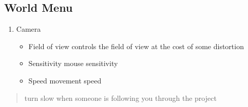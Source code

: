 \documentclass[letterpaper,10pt,english]{sphinxmanual}
\begin{document}
\subsection{World Menu}
\label{\detokenize{tutorial/Viewer_PC/documentation_rst/5_World:world-menu}}\label{\detokenize{tutorial/Viewer_PC/documentation_rst/5_World::doc}}
\noindent{}
\begin{enumerate}
%
\setcounter{enumi}{10}
\item {} 
\sphinxAtStartPar
Camera
\begin{itemize}
\item {} 
\sphinxAtStartPar
Field of view \sphinxhyphen{} controls the field of view at the cost of some distortion

\item {} 
\sphinxAtStartPar
Sensitivity \sphinxhyphen{} mouse sensitivity

\item {} 
\sphinxAtStartPar
Speed \sphinxhyphen{} movement speed

\end{itemize}

\end{enumerate}
\begin{quote}

\sphinxAtStartPar
{} turn slow when someone is following you through the project
\end{quote}
\end{document}
